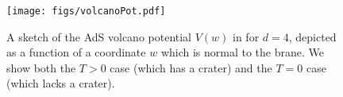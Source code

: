 \begin{figure}
\centering
\texttt{[image: figs/volcanoPot.pdf]}
\caption{A sketch of the AdS volcano potential $V(w)$ in \cite{Karch:2000ct} for $d = 4$, depicted as a function of a coordinate $w$ which is normal to the brane. We show both the $T > 0$ case (which has a crater) and the $T = 0$ case (which lacks a crater).}
\label{figs:volcanoPotential}
\end{figure}